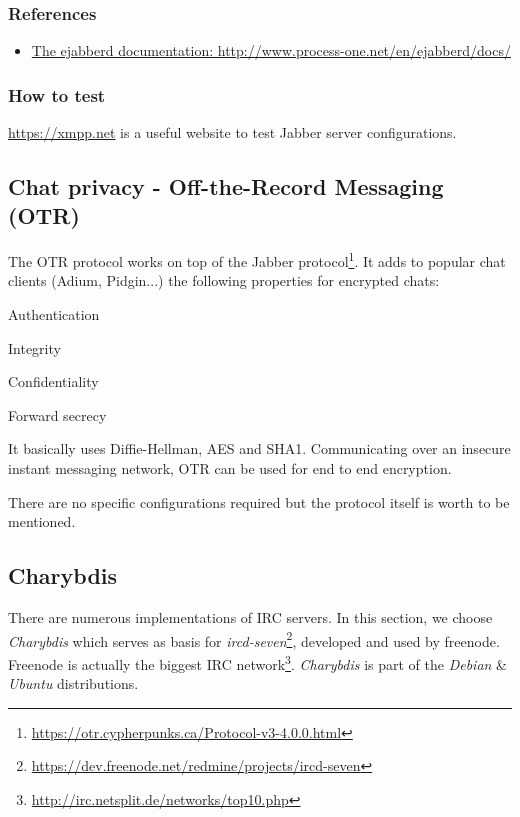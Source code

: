 \subsubsection{References}

\begin{itemize}
\item \href{http://www.process-one.net/en/ejabberd/docs/}{The ejabberd documentation: http://www.process-one.net/en/ejabberd/docs/}
\end{itemize}


\subsubsection{How to test}
\begin{itemize*}
  \item \url{https://xmpp.net} is a useful website to test Jabber server configurations.
\end{itemize*}


\subsection{Chat privacy - Off-the-Record Messaging (OTR)}

The OTR protocol works on top of the Jabber protocol\footnote{\url{https://otr.cypherpunks.ca/Protocol-v3-4.0.0.html}}.  
It adds to popular chat clients (Adium, Pidgin...) the following properties for encrypted chats:
\begin{itemize*}
  \item Authentication
  \item Integrity
  \item Confidentiality
  \item Forward secrecy
\end{itemize*}

It basically uses Diffie-Hellman, AES and SHA1. Communicating over an insecure instant messaging network, OTR can be used for end to end encryption.

There are no specific configurations required but the protocol itself is worth to be mentioned.


\subsection{Charybdis}
There are numerous implementations of IRC servers.  In this section, we choose \emph{Charybdis} which serves as basis for \emph{ircd-seven}\footnote{\url{https://dev.freenode.net/redmine/projects/ircd-seven}}, developed and used by freenode. Freenode is actually the biggest IRC network\footnote{\url{http://irc.netsplit.de/networks/top10.php}}. \emph{Charybdis} is part of the \emph{Debian} \& \emph{Ubuntu} distributions.


